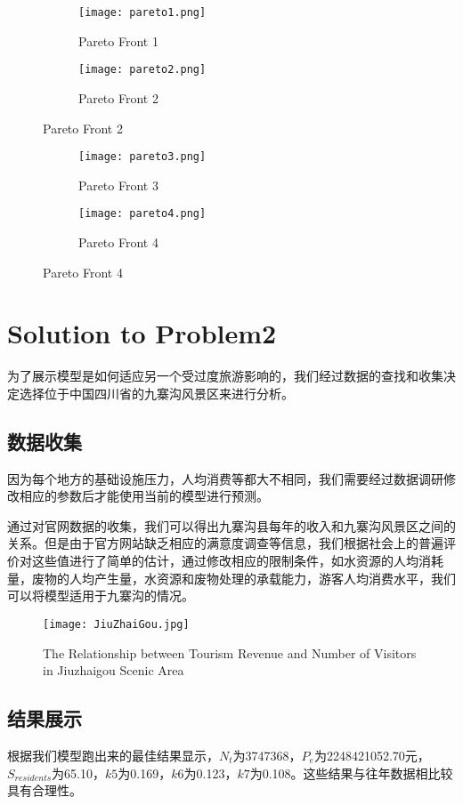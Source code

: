 \documentclass[12pt]{article}  %
\begin{document}
\begin{figure}[htbp]
\centering
\begin{subfigure}[b]{.4\textwidth}
\texttt{[image: pareto1.png]}
\caption{Pareto Front 1}\label{subfig:left1}
\end{subfigure}
\begin{subfigure}[b]{.4\textwidth}
	\texttt{[image: pareto2.png]}
	\caption{Pareto Front 2}\label{subfig:right1}
\end{subfigure}
\end{figure}

\begin{figure}[htbp]
	\centering
	\begin{subfigure}[b]{.4\textwidth}
		\texttt{[image: pareto3.png]}
		\caption{Pareto Front 3}\label{subfig:left2}
	\end{subfigure}
	\begin{subfigure}[b]{.4\textwidth}
		\texttt{[image: pareto4.png]}
		\caption{Pareto Front 4}\label{subfig:right2}
	\end{subfigure}
\end{figure}

\section{Solution to Problem2}
为了展示模型是如何适应另一个受过度旅游影响的，我们经过数据的查找和收集决定选择位于中国四川省的九寨沟风景区来进行分析。
\subsection{数据收集}
因为每个地方的基础设施压力，人均消费等都大不相同，我们需要经过数据调研修改相应的参数后才能使用当前的模型进行预测。

通过对官网数据的收集\cite{10}，我们可以得出九寨沟县每年的收入和九寨沟风景区之间的关系。但是由于官方网站缺乏相应的满意度调查等信息，我们根据社会上的普遍评价对这些值进行了简单的估计，通过修改相应的限制条件，如水资源的人均消耗量，废物的人均产生量，水资源和废物处理的承载能力，游客人均消费水平，我们可以将模型适用于九寨沟的情况。
\begin{figure}[H]
	\centering
	\texttt{[image: JiuZhaiGou.jpg]}
	\caption{The Relationship between Tourism Revenue and Number of Visitors in Jiuzhaigou Scenic Area}\label{fig:JiuZhaiGou}
\end{figure}
\subsection{结果展示}
根据我们模型跑出来的最佳结果显示，$N_t$为3747368，$P_e$为2248421052.70元，$S_{residents}$为65.10，$k5$为0.169，$k6$为0.123，$k7$为0.108。这些结果与往年数据相比较具有合理性。
\end{document}
